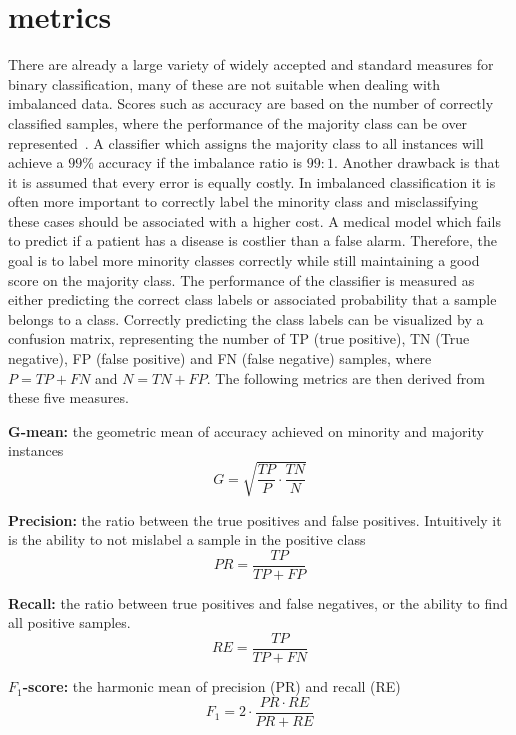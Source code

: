 \section{metrics}
There are already a large variety of widely accepted and standard measures for binary classification, many of these are not suitable when dealing with imbalanced data. Scores such as accuracy are based on the number of correctly classified samples, where the performance of the majority class can be over represented~\cite{Fernandez2018LearningSets}. A classifier which assigns the majority class to all instances will achieve a $99\%$ accuracy if the imbalance ratio is $99:1$. Another drawback is that it is assumed that every error is equally costly. In imbalanced classification it is often more important to correctly label the minority class and misclassifying these cases should be associated with a higher cost. A medical model which fails to predict if a patient has a disease is costlier than a false alarm. Therefore, the goal is to label more minority classes correctly while still maintaining a good score on the majority class. The performance of the classifier is measured as either predicting the correct class labels or associated probability that a sample belongs to a class. Correctly predicting the class labels can be visualized by a confusion matrix, representing the number of TP (true positive), TN (True negative), FP (false positive) and FN (false negative) samples, where $P = TP + FN$ and $N = TN + FP$. The following metrics are then derived from these five measures.

\textbf{G-mean:} the geometric mean of accuracy achieved on minority and majority instances
\begin{equation}
    G = \sqrt{\frac{TP}{P} \cdot \frac{TN}{N}}
\end{equation}

\textbf{Precision:} the ratio between the true positives and false positives. Intuitively it is the ability to not mislabel a sample in the positive class
\begin{equation}
    PR = \frac{TP}{TP + FP}
\end{equation}

\textbf{Recall:} the ratio between true positives and false negatives, or the ability to find all positive samples.
\begin{equation}
    RE = \frac{TP}{TP + FN}
\end{equation}

\textbf{$F_1$-score:} the harmonic mean of precision (PR) and recall (RE)
\begin{equation}
    F_1 = 2 \cdot \frac{PR \cdot RE}{PR + RE}
\end{equation}

